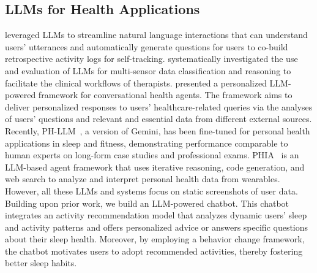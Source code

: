\subsection{LLMs for Health Applications}\label{subsec.llms4health}
\citet{kim2022leveraging} leveraged LLMs to streamline natural language interactions that can understand users' utterances and automatically generate questions for users to co-build retrospective activity logs for self-tracking.
\citet{englhardt2023classification} systematically investigated the use and evaluation of LLMs for multi-sensor data classification and reasoning to facilitate the clinical workflows of therapists.
\citet{abbasian2023conversational} presented a personalized LLM-powered framework for conversational health agents.
The framework aims to deliver personalized responses to users' healthcare-related queries via the analyses of users' questions and relevant and essential data from different external sources.
Recently, PH-LLM~\cite{cosentino2024towards}, a version of Gemini, has been fine-tuned for personal health applications in sleep and fitness, demonstrating performance comparable to human experts on long-form case studies and professional exams.
PHIA~\cite{merrill2024transforming} is an LLM-based agent framework that uses iterative reasoning, code generation, and web search to analyze and interpret personal health data from wearables.
However, all these LLMs and systems focus on static screenshots of user data.
Building upon prior work, we build an LLM-powered chatbot. 
This chatbot integrates an activity recommendation model that analyzes dynamic users' sleep and activity patterns and offers personalized advice or answers specific questions about their sleep health.
Moreover, by employing a behavior change framework, the chatbot motivates users to adopt recommended activities, thereby fostering better sleep habits.

